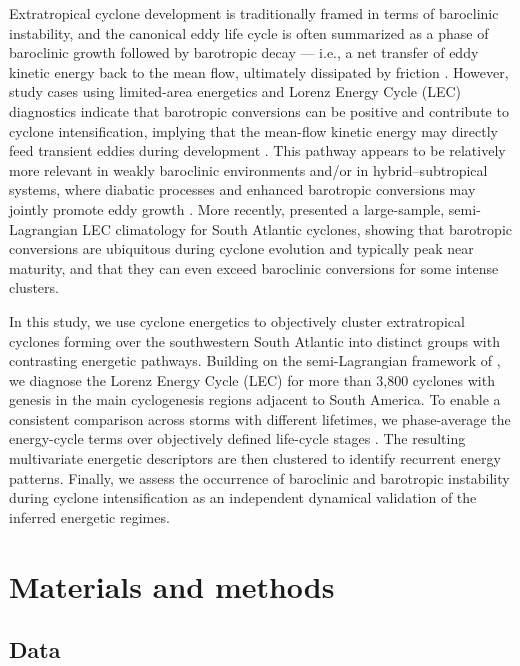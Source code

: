 \documentclass[pdflatex,sn-chicago]{sn-jnl}%
\theoremstyle{plain}
\theoremstyle{definition}
\theoremstyle{remark}
\theoremstyle{definition}
\begin{document}
Extratropical cyclone development is traditionally framed in terms of baroclinic instability, and the canonical eddy life cycle is often summarized as a phase of baroclinic growth followed by barotropic decay — i.e., a net transfer of eddy kinetic energy back to the mean flow, ultimately dissipated by friction \citep[e.g.,][]{simmons1978life,randel1985observed,ma2021lorenz,cai2007dynamical}. However, study cases using limited-area energetics and Lorenz Energy Cycle (LEC) diagnostics indicate that barotropic conversions can be positive and contribute to cyclone intensification, implying that the mean-flow kinetic energy may directly feed transient eddies during development \citep[e.g.,][]{bulic2006limited,dias2011energy,black2013universal,cavicchia2018energetics}. This pathway appears to be relatively more relevant in weakly baroclinic environments and/or in hybrid–subtropical systems, where diabatic processes and enhanced barotropic conversions may jointly promote eddy growth \citep[e.g.,][]{veiga2008analysis,pezza2014large,cavicchia2019physically}. More recently, \citet{de2025lorenz} presented a large-sample, semi-Lagrangian LEC climatology for South Atlantic cyclones, showing that barotropic conversions are ubiquitous during cyclone evolution and typically peak near maturity, and that they can even exceed baroclinic conversions for some intense clusters.

In this study, we use cyclone energetics to objectively cluster extratropical cyclones forming over the southwestern South Atlantic into distinct groups with contrasting energetic pathways. Building on the semi-Lagrangian framework of \citet{de2025lorenz}, we diagnose the Lorenz Energy Cycle (LEC) for more than 3,800 cyclones with genesis in the main cyclogenesis regions adjacent to South America. To enable a consistent comparison across storms with different lifetimes, we phase-average the energy-cycle terms over objectively defined life-cycle stages \citep{couto2024new}. The resulting multivariate energetic descriptors are then clustered to identify recurrent energy patterns. Finally, we assess the occurrence of baroclinic and barotropic instability during cyclone intensification as an independent dynamical validation of the inferred energetic regimes.

\section{Materials and methods}

\subsection{Data}\label{sec:data}
\end{document}
